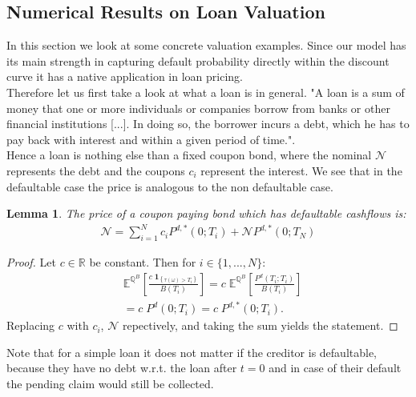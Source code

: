 \documentclass[12pt]{article}
\newtheorem{lemma}[theorem]{Lemma}
\begin{document}
	
	\subsection{Numerical Results on Loan Valuation}\label{sec:numericalvaluation}
	In this section we look at some concrete valuation examples. Since our model has its main strength in capturing default probability directly within the discount curve it has a native application in loan pricing.\\
	Therefore let us first take a look at what a loan is in general. "A loan is a sum of money that one or more individuals or companies borrow from banks or other financial institutions [...]. In doing so, the borrower incurs a debt, which he has to pay back with interest and within a given period of time."\cite{corpFinInst}.\\
	Hence a loan is nothing else than a fixed coupon bond, where the nominal $\mathcal{N}$ represents the debt and the coupons $c_i$ represent the interest.
	We see that in the defaultable case the price is analogous to  the non defaultable case.
	\begin{lemma}
		The price of a coupon paying bond which has defaultable cashflows is:
		\begin{align*}
			\mathcal{N} = \sum_{i=1}^{N}c_i P^{d,*}(0;T_i) + \mathcal{N}P^{d,*}(0;T_N)
		\end{align*}
	\end{lemma}
	\begin{proof}
		Let $c\in \mathbb{R}$ be constant. Then for $i \in \{1, ..., N\}$:
		\begin{align*}
			&\mathbb{E}^{\mathbb{Q}^B}\left[\frac{c\;\mathbf{1}_{\left\{\tau(\omega) > T_{i} \right\}}}{B(T_i)}\right] = c \; \mathbb{E}^{\mathbb{Q}^B}\left[ 
			\frac{P^d(T_i;T_i)}{B(T_i)} \right]\\
			&= c \; P^d(0;T_i) = c \; P^{d,*}(0;T_i).
		\end{align*}
		Replacing $c$ with $c_i$, $\mathcal{N}$ repectively, and taking the sum yields the statement.
	\end{proof}
	Note that for a simple loan it does not matter if the creditor is defaultable, because they have no debt w.r.t. the loan after $t=0$ and in case of their default the pending claim would still be collected.
\end{document}
